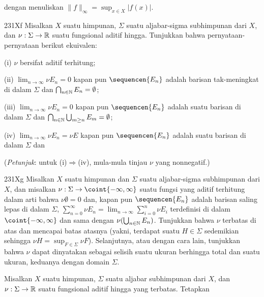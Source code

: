 { 
      
\noindent dengan menuliskan 
$\|f\|_{\infty}=\sup_{x\in X}|f(x)|$. 
      
\sqheader 231Xf Misalkan $X$ suatu himpunan, $\Sigma$ suatu aljabar-sigma 
subhimpunan dari $X$, dan $\nu:\Sigma\to \Bbb R$ suatu fungsional aditif 
hingga.   Tunjukkan bahwa pernyataan-pernyataan berikut ekuivalen: 
      
\quad (i) $\nu$ bersifat aditif terhitung; 
      
\quad (ii) $\lim_{n\to\infty}\nu E_n=0$ kapan pun $\sequencen{E_n}$ 
adalah barisan tak-meningkat di dalam $\Sigma$ dan 
$\bigcap_{n\in\Bbb N}E_n=\emptyset$; 
      
\quad (iii) $\lim_{n\to\infty}\nu E_n=0$ kapan pun 
$\sequencen{E_n}$ adalah suatu barisan di dalam $\Sigma$ dan 
$\bigcap_{n\in\Bbb N}\bigcup_{m\ge n}E_m=\emptyset$; 
      
\quad (iv) $\lim_{n\to\infty}\nu E_n=\nu E$ kapan pun 
$\sequencen{E_n}$ adalah suatu barisan di dalam $\Sigma$ dan 
      
      
\noindent({\it Petunjuk}: untuk (i)$\Rightarrow$(iv), mula-mula tinjau 
$\nu$ yang nonnegatif.) 
      
\spheader 231Xg Misalkan $X$ suatu himpunan dan $\Sigma$ suatu aljabar-sigma 
subhimpunan dari 
$X$, dan misalkan $\nu:\Sigma\to\coint{-\infty,\infty}$ suatu fungsi yang 
aditif terhitung dalam arti bahwa $\nu\emptyset=0$ dan, kapan pun 
$\sequencen{E_n}$ adalah barisan saling lepas di dalam $\Sigma$, 
$\sum_{n=0}^{\infty}\nu E_n=\lim_{n\to\infty}\sum_{i=0}^n\nu E_i$ 
terdefinisi di dalam $\coint{-\infty,\infty}$ dan sama dengan 
$\nu(\bigcup_{n\in\Bbb N}E_n)$.   Tunjukkan bahwa $\nu$ terbatas 
di atas dan mencapai batas atasnya (yakni, terdapat suatu $H\in\Sigma$ 
sedemikian sehingga $\nu H=\sup_{F\in\Sigma}\nu F$).   Selanjutnya, atau 
dengan cara lain, tunjukkan bahwa $\nu$ dapat dinyatakan sebagai selisih 
suatu ukuran berhingga total dan suatu ukuran, keduanya dengan domain 
$\Sigma$. 
      
 Misalkan $X$ suatu himpunan, 
$\Sigma$ suatu aljabar subhimpunan dari $X$, dan $\nu:\Sigma\to\Bbb R$ 
suatu fungsional aditif hingga yang terbatas.   Tetapkan 
      
}
